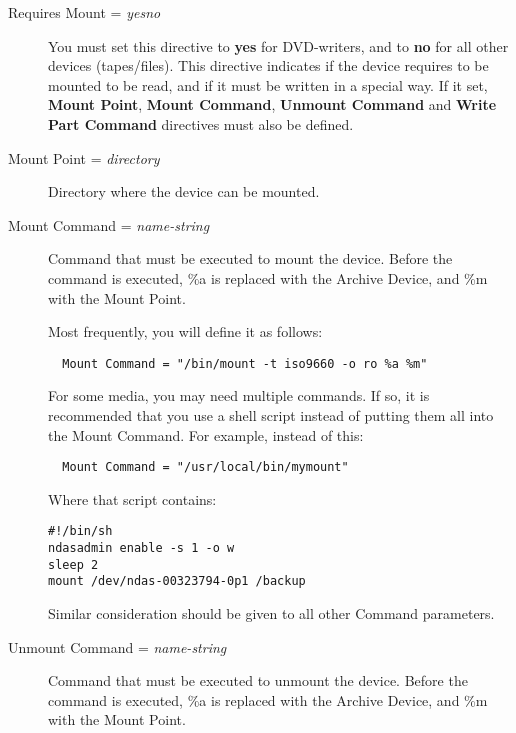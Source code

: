 \begin{description}

\item [Requires Mount = {\it yes\vb{}no}]
   You must set this directive to {\bf yes} for DVD-writers,  and to {\bf no} for
   all other devices (tapes/files).  This directive indicates if the device
   requires to be mounted to be read,  and if it must be written in a special way.
   If it set, {\bf Mount Point},  {\bf Mount Command}, {\bf Unmount Command} and
   {\bf Write Part Command}  directives must also be defined. 

\item [Mount Point = {\it directory}]
   Directory where the device can be mounted. 

\item [Mount Command = {\it name-string}]
   Command that must be executed to mount the device. Before the command is 
   executed, \%a is replaced with the Archive Device, and \%m with the Mount 
   Point.

   Most frequently, you will define it as follows:  

\footnotesize
\begin{verbatim}
  Mount Command = "/bin/mount -t iso9660 -o ro %a %m"
\end{verbatim}
\normalsize

For some media, you may need multiple commands.  If so, it is recommended
that you use a shell script instead of putting them all into the Mount
Command.  For example, instead of this:

\footnotesize
\begin{verbatim}
  Mount Command = "/usr/local/bin/mymount"
\end{verbatim}
\normalsize

Where that script contains:

\footnotesize
\begin{verbatim}
#!/bin/sh
ndasadmin enable -s 1 -o w
sleep 2
mount /dev/ndas-00323794-0p1 /backup
\end{verbatim}
\normalsize

Similar consideration should be given to all other Command parameters.

\item [Unmount Command = {\it name-string}]
   Command that must be executed to unmount the device. Before the command  is
   executed, \%a is replaced with the Archive Device, and \%m with the  Mount
   Point.


\end{description}
